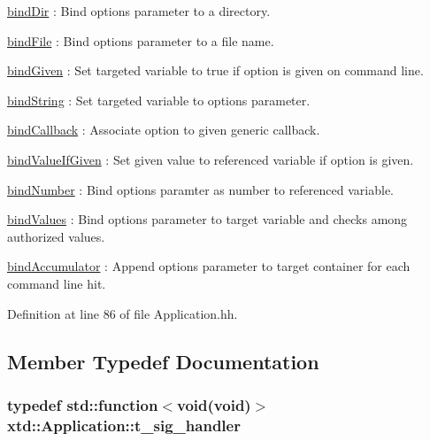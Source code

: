 \begin{DoxyItemize}
\item \hyperlink{classxtd_1_1Application_a2b491ba745bbd3b2d01d9e623c0aff60}{bind\+Dir} \+: Bind option\textquotesingle{}s parameter to a directory.
\item \hyperlink{classxtd_1_1Application_ab10f6dde0bf4034dff7eafe8a45c2029}{bind\+File} \+: Bind option\textquotesingle{}s parameter to a file name.
\item \hyperlink{classxtd_1_1Application_a59b986c85c2e1d9473f73df10425dfcf}{bind\+Given} \+: Set targeted variable to true if option is given on command line.
\item \hyperlink{classxtd_1_1Application_a36a351db3830e2e894a39fbd42842280}{bind\+String} \+: Set targeted variable to option\textquotesingle{}s parameter.
\item \hyperlink{classxtd_1_1Application_a00f6aed6c376028a79492b04e8325968}{bind\+Callback} \+: Associate option to given generic callback.
\item \hyperlink{classxtd_1_1Application_a2415acb66badb368e726173fb884097c}{bind\+Value\+If\+Given} \+: Set given value to referenced variable if option is given.
\item \hyperlink{classxtd_1_1Application_ae5fd6c9b1d2ad5225f9d624f63df4173}{bind\+Number} \+: Bind option\textquotesingle{}s paramter as number to referenced variable.
\item \hyperlink{classxtd_1_1Application_aaa0388f1c96893a26cfe5522b0804dd9}{bind\+Values} \+: Bind option\textquotesingle{}s parameter to target variable and checks among authorized values.
\item \hyperlink{classxtd_1_1Application_a846da30aaf55754027608ddf5c689366}{bind\+Accumulator} \+: Append option\textquotesingle{}s parameter to target container for each command line hit. 
\end{DoxyItemize}

Definition at line 86 of file Application.\+hh.



\subsection{Member Typedef Documentation}
\subsubsection[{\texorpdfstring{t\+\_\+sig\+\_\+handler}{t_sig_handler}}]{\setlength{\rightskip}{0pt plus 5cm}typedef std\+::function$<$void(void)$>$ {\bf xtd\+::\+Application\+::t\+\_\+sig\+\_\+handler}\hspace{0.3cm}{\ttfamily [protected]}}\hypertarget{classxtd_1_1Application_a907b6fe8247636495890e668530863d6}{}\label{classxtd_1_1Application_a907b6fe8247636495890e668530863d6}


